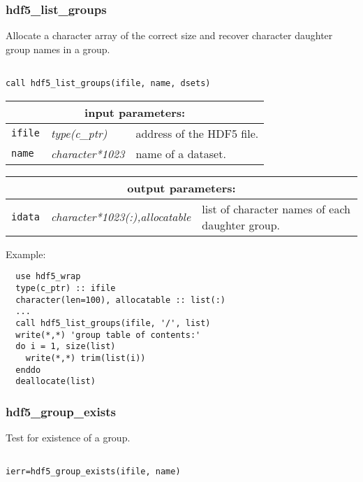 \subsubsection{hdf5\_list\_groups}

Allocate a character array of the correct size and recover character daughter group names in a group.

\begin{verbatim}

call hdf5_list_groups(ifile, name, dsets)
\end{verbatim}

\noindent
\begin{tabular}{|p{1.5cm}|p{3cm}|p{10cm}|}
\hline
\multicolumn{3}{|c|}{\bf input parameters:} \\
\hline
{\tt ifile} & {\it type(c\_ptr)} & address of the HDF5 file. \\
\hline
{\tt name} & {\it character*1023} & name of a dataset. \\
\hline
\end{tabular}

\vskip 0.8cm

\noindent
\begin{tabular}{|p{1.5cm}|p{4.5cm}|p{8.5cm}|}
\hline
\multicolumn{3}{|c|}{\bf output parameters:} \\
\hline
{\tt idata} & {\it character*1023(:),allocatable} & list of character names of each daughter group.\\
\hline
\end{tabular}

\vskip 0.5cm

\noindent Example:
\begin{verbatim}
  use hdf5_wrap
  type(c_ptr) :: ifile
  character(len=100), allocatable :: list(:)
  ...
  call hdf5_list_groups(ifile, '/', list)
  write(*,*) 'group table of contents:'
  do i = 1, size(list)
    write(*,*) trim(list(i))
  enddo
  deallocate(list)
\end{verbatim}

\subsubsection{hdf5\_group\_exists}

Test for existence of a group.

\begin{verbatim}

ierr=hdf5_group_exists(ifile, name)
\end{verbatim}


